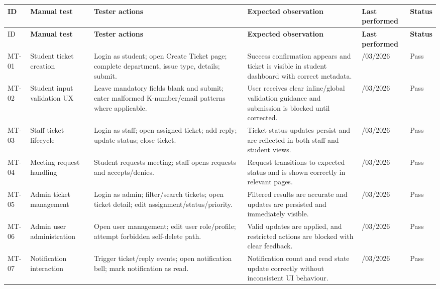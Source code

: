 \setlength{\LTleft}{0pt}
\setlength{\LTright}{0pt}
\setlength{\tabcolsep}{3pt}
\renewcommand{\arraystretch}{1.15}
\scriptsize
\begin{longtable}{|>{\raggedright\arraybackslash}p{0.8cm}|>{\raggedright\arraybackslash}p{2.0cm}|>{\raggedright\arraybackslash}p{3.8cm}|>{\raggedright\arraybackslash}p{3.8cm}|>{\raggedright\arraybackslash}p{1.5cm}|>{\centering\arraybackslash}p{0.9cm}|}
\hline
	ID & \textbf{Manual test} & \textbf{Tester actions} & \textbf{Expected observation} & \textbf{Last performed} & \textbf{Status} \\
\hline
\endfirsthead
\hline
	ID & \textbf{Manual test} & \textbf{Tester actions} & \textbf{Expected observation} & \textbf{Last performed} & \textbf{Status} \\
\hline
\endhead
MT-01 & Student ticket creation & Login as student; open Create Ticket page; complete department, issue type, details; submit. & Success confirmation appears and ticket is visible in student dashboard with correct metadata. & 27/03/2026 & Pass \\
\hline
MT-02 & Student input validation UX & Leave mandatory fields blank and submit; enter malformed K-number/email patterns where applicable. & User receives clear inline/global validation guidance and submission is blocked until corrected. & 27/03/2026 & Pass \\
\hline
MT-03 & Staff ticket lifecycle & Login as staff; open assigned ticket; add reply; update status; close ticket. & Ticket status updates persist and are reflected in both staff and student views. & 27/03/2026 & Pass \\
\hline
MT-04 & Meeting request handling & Student requests meeting; staff opens requests and accepts/denies. & Request transitions to expected status and is shown correctly in relevant pages. & 27/03/2026 & Pass \\
\hline
MT-05 & Admin ticket management & Login as admin; filter/search tickets; open ticket detail; edit assignment/status/priority. & Filtered results are accurate and updates are persisted and immediately visible. & 27/03/2026 & Pass \\
\hline
MT-06 & Admin user administration & Open user management; edit user role/profile; attempt forbidden self-delete path. & Valid updates are applied, and restricted actions are blocked with clear feedback. & 27/03/2026 & Pass \\
\hline
MT-07 & Notification interaction & Trigger ticket/reply events; open notification bell; mark notification as read. & Notification count and read state update correctly without inconsistent UI behaviour. & 27/03/2026 & Pass \\

\end{longtable}

